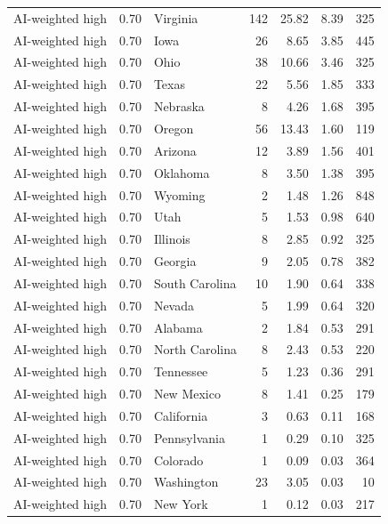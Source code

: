 \documentclass[12pt]{article}
\begin{document}
\begin{landscape}
\begin{longtable}{ll l r r r r}
AI-weighted high & 0.70 & Virginia & 142 & 25.82 & 8.39 & 325 \\
AI-weighted high & 0.70 & Iowa & 26 & 8.65 & 3.85 & 445 \\
AI-weighted high & 0.70 & Ohio & 38 & 10.66 & 3.46 & 325 \\
AI-weighted high & 0.70 & Texas & 22 & 5.56 & 1.85 & 333 \\
AI-weighted high & 0.70 & Nebraska & 8 & 4.26 & 1.68 & 395 \\
AI-weighted high & 0.70 & Oregon & 56 & 13.43 & 1.60 & 119 \\
AI-weighted high & 0.70 & Arizona & 12 & 3.89 & 1.56 & 401 \\
AI-weighted high & 0.70 & Oklahoma & 8 & 3.50 & 1.38 & 395 \\
AI-weighted high & 0.70 & Wyoming & 2 & 1.48 & 1.26 & 848 \\
AI-weighted high & 0.70 & Utah & 5 & 1.53 & 0.98 & 640 \\
AI-weighted high & 0.70 & Illinois & 8 & 2.85 & 0.92 & 325 \\
AI-weighted high & 0.70 & Georgia & 9 & 2.05 & 0.78 & 382 \\
AI-weighted high & 0.70 & South Carolina & 10 & 1.90 & 0.64 & 338 \\
AI-weighted high & 0.70 & Nevada & 5 & 1.99 & 0.64 & 320 \\
AI-weighted high & 0.70 & Alabama & 2 & 1.84 & 0.53 & 291 \\
AI-weighted high & 0.70 & North Carolina & 8 & 2.43 & 0.53 & 220 \\
AI-weighted high & 0.70 & Tennessee & 5 & 1.23 & 0.36 & 291 \\
AI-weighted high & 0.70 & New Mexico & 8 & 1.41 & 0.25 & 179 \\
AI-weighted high & 0.70 & California & 3 & 0.63 & 0.11 & 168 \\
AI-weighted high & 0.70 & Pennsylvania & 1 & 0.29 & 0.10 & 325 \\
AI-weighted high & 0.70 & Colorado & 1 & 0.09 & 0.03 & 364 \\
AI-weighted high & 0.70 & Washington & 23 & 3.05 & 0.03 & 10 \\
AI-weighted high & 0.70 & New York & 1 & 0.12 & 0.03 & 217 \\
\bottomrule
\end{longtable}
\end{landscape}
\end{document}
